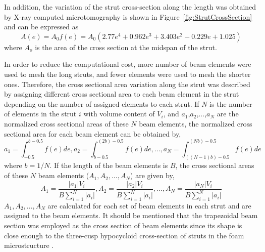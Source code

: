\documentclass[review]{elsarticle}
\begin{document}
In addition, the variation of the strut cross-section along the length was obtained by X-ray computed microtomography is shown in Figure~\ref{fig:StrutCrossSection} and can be expressed as
\begin{equation}
A(e)=A_0f(e)=A_0(2.77e^4+0.962e^3+3.403e^2-0.229e+1.025)
\end{equation} 
where $A_o$ is the area of the cross section at the midspan of the strut.

In order to reduce the computational cost, more number of beam elements were used to mesh the long struts, and fewer elements were used to mesh the shorter ones. Therefore, the cross sectional area variation along the strut was described by assigning different cross sectional area to each beam element in the strut depending on the number of assigned elements to each strut. If $N$ is the number of elements in the strut $i$ with volume content of $V_i$, and $a_1$,$a_2$,$...$,$a_N$ are the normalized cross sectional areas of these $N$ beam elements, the normalized cross sectional area for each beam element can be obtained by,
\begin{equation}
a_1=\int_{-0.5}^{b-0.5}f(e)de, a_2=\int_{b-0.5}^{(2b)-0.5}f(e)de, ..., a_N=\int_{((N-1)b)-0.5}^{(Nb)-0.5}f(e)de 
\end{equation}
where $b=1/N$. If the length of the beam elements is $B$, the cross sectional areas of these $N$ beam elements ($A_1, A_2, ..., A_N$) are given by,
\begin{equation}
A_1=\frac{\vert a_1 \vert V_i}{B \sum_{i=1}^{N}\vert a_i \vert}, A_2=\frac{\vert a_2 \vert V_i}{B \sum_{i=1}^{N}\vert a_i \vert}, ..., A_N=\frac{\vert a_N \vert V_i}{B \sum_{i=1}^{N}\vert a_i \vert}
\end{equation}
$A_1, A_2, ..., A_N$ are calculated for each set of  beam elements in each strut and are  assigned to  the beam elements. It should be mentioned that the trapezoidal beam section was employed as the cross section of beam elements since its shape is close enough to the three-cusp hypocycloid cross-section of struts in the foam microstructure \citep{Jang20081845}. 
\end{document}
